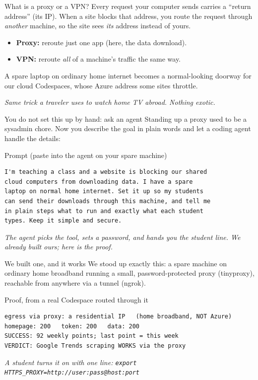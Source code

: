 \documentclass[aspectratio=169,11pt]{beamer}
\begin{document}
\begin{frame}{What is a proxy or a VPN?}
  Every request your computer sends carries a ``return address'' (its IP). When a site blocks
  that address, you route the request through \emph{another} machine, so the site sees
  \emph{its} address instead of yours.
  \begin{itemize}
    \item \textbf{Proxy:} reroute just one app (here, the data download).
    \item \textbf{VPN:} reroute \emph{all} of a machine's traffic the same way.
  \end{itemize}
  A spare laptop on ordinary home internet becomes a normal-looking doorway for our cloud
  Codespaces, whose Azure address some sites throttle.
  \vspace{0.2em}
  \begin{center}
    \itshape Same trick a traveler uses to watch home TV abroad. Nothing exotic.
  \end{center}
\end{frame}

\begin{frame}[fragile]{You do not set this up by hand: ask an agent}
  Standing up a proxy used to be a sysadmin chore. Now you describe the goal in plain words
  and let a coding agent handle the details:
  \begin{block}{Prompt (paste into the agent on your spare machine)}
  \begin{lstlisting}
I'm teaching a class and a website is blocking our shared
cloud computers from downloading data. I have a spare
laptop on normal home internet. Set it up so my students
can send their downloads through this machine, and tell me
in plain steps what to run and exactly what each student
types. Keep it simple and secure.
  \end{lstlisting}
  \end{block}
  \begin{center}
    \itshape The agent picks the tool, sets a password, and hands you the student line.
    We already built ours; here is the proof.
  \end{center}
\end{frame}

\begin{frame}[fragile]{We built one, and it works}
  We stood up exactly this: a spare machine on ordinary home broadband running a small,
  password-protected proxy (tinyproxy), reachable from anywhere via a tunnel (ngrok).
  \begin{block}{Proof, from a real Codespace routed through it}
  \begin{lstlisting}
egress via proxy: a residential IP   (home broadband, NOT Azure)
homepage: 200   token: 200   data: 200
SUCCESS: 92 weekly points; last point = this week
VERDICT: Google Trends scraping WORKS via the proxy
  \end{lstlisting}
  \end{block}
  \begin{center}
    \itshape A student turns it on with one line:
    \texttt{export HTTPS\_PROXY=http://user:pass@host:port}
  \end{center}
\end{frame}
\end{document}
